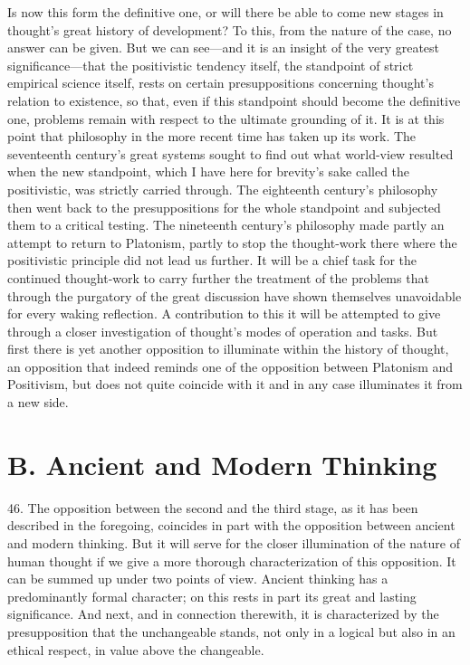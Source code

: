 \documentclass[12pt,a4paper]{book}
\newcommand{\opage}[1]{\marginnote{\footnotesize\textit{[#1]}}}
\begin{document}
\opage{123}Is now this form the definitive one, or will there be able to come new
stages in thought's great history of development? To this, from the nature
of the case, no answer can be given. But we can see---and it is an insight
of the very greatest significance---that the positivistic tendency itself,
the standpoint of strict empirical science itself, rests on certain
presuppositions concerning thought's relation to existence, so that, even
if this standpoint should become the definitive one, problems remain with
respect to the ultimate grounding of it. It is at this point that
philosophy in the more recent time has taken up its work. The seventeenth
century's great systems sought to find out what world-view resulted when
the new standpoint, which I have here for brevity's sake called the
positivistic, was strictly carried through. The eighteenth century's
philosophy then went back to the presuppositions for the whole standpoint
and subjected them to a critical testing. The nineteenth century's
philosophy made partly an attempt to return to Platonism, partly to stop
the thought-work there where the positivistic principle did not lead us
further. It will be a chief task for the continued thought-work to carry
further the treatment of the problems that through the purgatory of the
great discussion have shown themselves unavoidable for every waking
reflection. A contribution to this it will be attempted to give through a
closer investigation of thought's modes of operation and tasks. But first
there is yet another opposition to illuminate within the history of
thought, an opposition that indeed reminds one of the opposition between
Platonism and Positivism, but does not quite coincide with it and in any
case illuminates it from a new side.

\section*{B. Ancient and Modern Thinking}
\label{sec:antik-moderne}

46. The opposition between the second and the third stage, as it has been
described in the foregoing, coincides in part with the opposition between
ancient and modern \opage{124}thinking. But it will serve for the closer illumination
of the nature of human thought if we give a more thorough characterization
of this opposition. It can be summed up under two points of view. Ancient
thinking has a predominantly formal character; on this rests in part its
great and lasting significance. And next, and in connection therewith, it
is characterized by the presupposition that the unchangeable stands, not
only in a logical but also in an ethical respect, in value above the
changeable.
\end{document}
